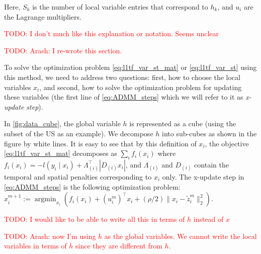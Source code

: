 \documentclass{article}
\DeclareMathOperator*{\argmin}{argmin}
\newcommand{\attn}[1]{\textcolor{red}{TODO: #1}}
\newcommand{\given}{\;\vert\;}
\begin{document}
Here, $S_k$ is the number of local variable entries that correspond to
$h_k$, and $u_i$ are the Lagrange multipliers.  

\attn{I don't much like this explanation or notation. Seems unclear}

\attn{Arash: I re-wrote this section.}

To solve the optimization problem \eqref{eq:l1tf_var_st_mat} or
\eqref{eq:l1tf_var_st} using this method, we need to address two
questions: first, how to choose the 
local variables $x_i$, and second, how to solve the optimization
problem for updating these variables (the first line of
\eqref{eq:ADMM_steps} which we will refer to it as \textit{x-update step}).  

In \autoref{fig:data_cube}, the global variable $h$ is represented
as a cube (using the subset of the US as an example). We decompose $h$
into sub-cubes as shown in the figure by white lines. It is easy to see
that by this definition of $x_i$, the objective
\eqref{eq:l1tf_var_st_mat} decomposes as $\sum_i f_i(x_i)$ where
$f_i(x_i)=-l(y_i\given x_i)+\Lambda_{(i)}^\top |D_{(i)}x_i|$, and
$\Lambda_{(i)}$ and $D_{(i)}$ contain the temporal and spatial
penalties corresponding to $x_i$ only. The x-update step in \autoref{eq:ADMM_steps} is the following optimization problem: $x_i^{m+1}:=\argmin_{x_i} ( f_i(x_i) +
(u_i^m)^\top x_i + (\rho/2) \lVert x_i-\tilde{z}_i^m \lVert_2^2)$.

\attn{I would like to be able to write all this in terms of $h$ instead of $x$}

\attn{Arash: now I'm using $h$ as the global variables. We cannot write the local variables in terms of $h$ since they are different from $h$.}
  
  
\end{document}
